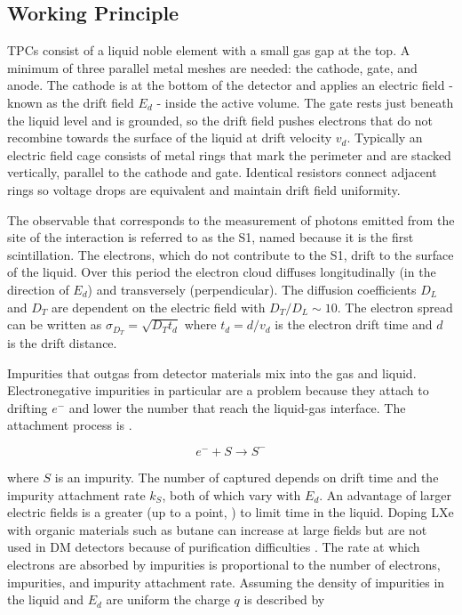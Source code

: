\subsection{Working Principle}
\label{subsec:tpcs_working_principle}
TPCs consist of a liquid noble element with a small gas gap at the top.  A minimum of three parallel metal meshes are needed: the
cathode, gate, and anode.  The cathode is
at the bottom of the detector and applies an electric field - known as the drift field $E_d$ - inside the active volume.  The gate rests
just beneath the liquid level and is grounded, so the drift field pushes electrons that do not recombine towards the surface of the liquid
at drift velocity $v_{d}$.  Typically an electric field cage consists
of metal rings that mark the perimeter and are stacked vertically, parallel to the cathode and gate.  Identical resistors connect adjacent
rings so voltage drops are equivalent and maintain drift field uniformity.

The observable that corresponds to the measurement of photons emitted from the site of the interaction is referred to as the S1, named
because it is the first scintillation.  The electrons, which do not contribute to the S1, drift to the surface of the liquid.  Over this
period the electron cloud diffuses longitudinally (in the direction of $E_{d}$) and transversely (perpendicular).  The
diffusion coefficients $D_{L}$ and $D_{T}$ are dependent on the electric field with $D_{T}/D_{L} \sim 10$.  The electron spread can
be written as $\sigma_{D_{T}} = \sqrt{D_{T} t_{d}}$ where $t_{d} = d/v_{d}$ is the electron drift time and $d$ is the drift distance.

Impurities that outgas from detector materials mix into the gas and liquid.  Electronegative impurities in particular are a problem
because they attach to drifting $e^{-}$ and
lower the number that reach the liquid-gas interface.  The attachment process
is .

\begin{equation}
e^{-} + S \rightarrow S^{-}
\label{eq:impurity_attach}
\end{equation}

\noindent where $S$ is an impurity.  The number of \electron captured depends on drift time and the impurity attachment rate
$k_{S}$, both of which vary with $E_{d}$.  An advantage of larger electric fields is a greater
\vd (up to a point, ) to limit time in the liquid.  Doping LXe with organic materials such as butane
can increase \vd at large
fields but are not used in DM detectors because of purification difficulties .  The rate at which electrons are
absorbed by impurities is proportional to the number of electrons, impurities, and impurity attachment rate.  Assuming the density
of impurities in the liquid and $E_{d}$ are uniform the charge $q$ is described by

